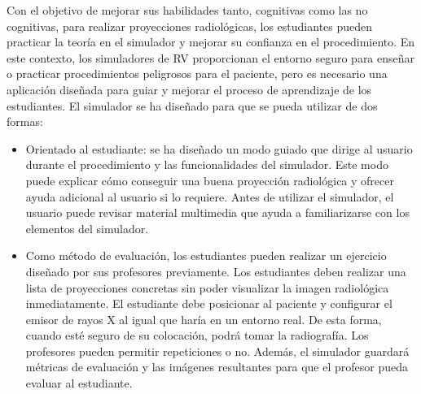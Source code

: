 Con el objetivo de mejorar sus habilidades tanto, cognitivas como las no cognitivas, para realizar proyecciones radiológicas, los estudiantes pueden practicar la teoría en el simulador y mejorar su confianza en el procedimiento. En este contexto, los simuladores de \ac{RV} proporcionan el entorno seguro para enseñar o practicar procedimientos peligrosos para el paciente, pero es necesario una aplicación diseñada para guiar y mejorar el proceso de aprendizaje de los estudiantes. El simulador se ha diseñado para que se pueda utilizar de dos formas:
\begin{itemize}
    \item Orientado al estudiante: se ha diseñado un modo guiado que dirige al usuario durante el procedimiento y las funcionalidades del simulador. Este modo puede explicar cómo conseguir una buena proyección radiológica y ofrecer ayuda adicional al usuario si lo requiere. Antes de utilizar el simulador, el usuario puede revisar material multimedia que ayuda a familiarizarse con los elementos del simulador.
    
    \item Como método de evaluación, los estudiantes pueden realizar un ejercicio diseñado por sus profesores previamente. Los estudiantes deben realizar una lista de proyecciones concretas sin poder visualizar la imagen radiológica inmediatamente. El estudiante debe posicionar al paciente y configurar el emisor de rayos X al igual que haría en un entorno real. De esta forma, cuando esté seguro de su colocación, podrá tomar la radiografía. Los profesores pueden permitir repeticiones o no. Además, el simulador guardará métricas de evaluación y las imágenes resultantes para que el profesor pueda evaluar al estudiante.
    
\end{itemize}







